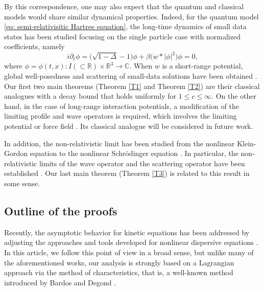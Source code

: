 \documentclass[reqno, 11pt, letterpaper]{amsart}
\theoremstyle{remark}
\numberwithin{equation}{section}
\numberwithin{theorem}{section}
\numberwithin{table}{section}
\numberwithin{figure}{section}
\begin{document}
By this correspondence, one may also expect that the quantum and classical models would share similar dynamical properties. Indeed, for the quantum model \eqref{eq: semi-relativisitic Hartree equation}, the long-time dynamics of small data states has been studied focusing on the single particle case with normalized coefficients, namely
\begin{equation}\label{eq: semi-relativisitic Hartree equation-one particle}
i\partial_t\phi=\big(\sqrt{1-\Delta}-1\big)\phi+\beta \big(w*|\phi|^2\big) \phi=0,
\end{equation}
where $\phi=\phi(t,x): I(\subset\mathbb{R})\times\mathbb{R}^3\to\mathbb{C}$. When $w$ is a short-range potential, global well-posedness and scattering of small-data solutions have been obtained \cite{ChoOzawa06, ChoOzawaSasakiShim09, HayahiNaumkinOgawa15, HerrTesfahun15, Yang19}. Our first two main theorems (Theorem \ref{T1} and Theorem \ref{T2}) are their classical analogues with a decay bound that holds uniformly for $1 \leq c\leq \infty$. On the other hand, in the case of long-range interaction potentials, a modification of the limiting profile and wave operators is required, which involves the limiting potential or force field \cite{Pusateri14}. Its classical analogue will be considered in future work.

In addition, the non-relativistic limit has been studied from the nonlinear Klein-Gordon equation to the nonlinear Schr\"odinger equation \cite{MachiharaNakanishiOzawa02, MasmoudiNakanishi02}. In particular, the non-relativistic limits of the wave operator and the scattering operator have been established \cite{Nakanishi}. Our last main theorem (Theorem \ref{T3}) is related to this result in some sense.

\subsection{Outline of the proofs}

Recently, the asymptotic behavior for kinetic equations has been addressed by adjusting the approaches and tools developed for nonlinear dispersive equations \cite{ChoiHa, ChoiKwon, HJT, HuangKwon, IPWW22, Wang23}. In this article, we follow this point of view in a broad sense, but unlike many of the aforementioned works, our analysis is strongly based on a Lagrangian approach via the method of characteristics, that is, a well-known method introduced by Bardos and Degond \cite{BD}.
\end{document}
